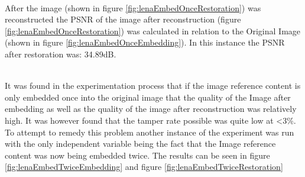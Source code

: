 \documentclass[12pt]{article}
\begin{document}
\hspace{0pt} \\
After the image (shown in figure \ref{fig:lenaEmbedOnceRestoration}) was reconstructed the PSNR of the image after reconstruction (figure \ref{fig:lenaEmbedOnceRestoration}) was calculated in relation to the Original Image (shown in figure \ref{fig:lenaEmbedOnceEmbedding}).
In this instance the PSNR after restoration was: 34.89dB.

\hspace{0pt} \\
It was found in the experimentation process that if the image reference content is only embedded once into the original image that the quality of the Image after embedding as well as the quality of the image after reconstruction was relatively high.
It was however found that the tamper rate possible was quite low at \textless 3\%.
To attempt to remedy this problem another instance of the experiment was run with the only independent variable being the fact that the Image reference content was now being embedded twice.
The results can be seen in figure \ref{fig:lenaEmbedTwiceEmbedding} and figure \ref{fig:lenaEmbedTwiceRestoration}
\end{document}
